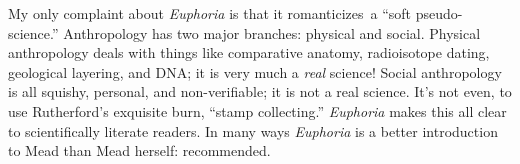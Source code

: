 My only complaint about \emph{Euphoria} is that it romanticizes~a ``soft
pseudo-science.'' Anthropology has two major branches: physical and
social. Physical anthropology deals with things like comparative
anatomy, radioisotope dating, geological layering, and DNA; it is very
much a \emph{real} science! Social anthropology is all squishy,
personal, and non-verifiable; it is not a real science. It's not even,
to use Rutherford's exquisite burn, ``stamp collecting.'' \emph{Euphoria} makes
this all clear to scientifically literate
readers. In many ways \emph{Euphoria} is a better introduction to Mead
than Mead herself: recommended.




%